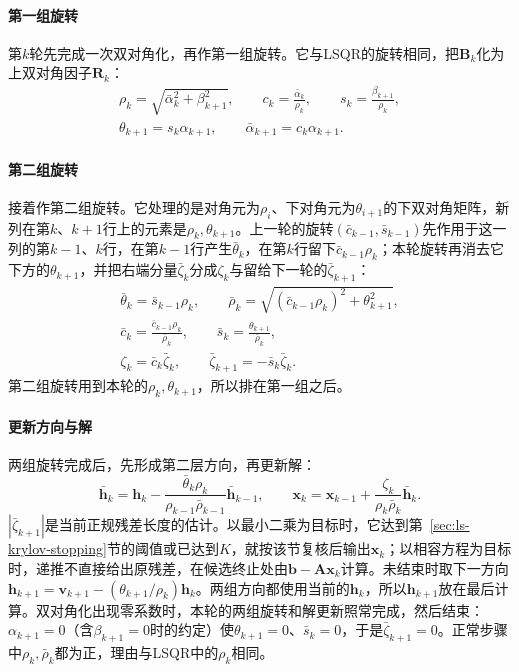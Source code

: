 \paragraph{第一组旋转}
第$k$轮先完成一次双对角化，再作第一组旋转。它与LSQR的旋转相同，把$\bm B_k$化为上双对角因子$\bm R_k$：
\[
 \begin{gathered}
 \rho_k=\sqrt{\bar\alpha_k^2+\beta_{k+1}^2},\qquad
 c_k=\frac{\bar\alpha_k}{\rho_k},\qquad s_k=\frac{\beta_{k+1}}{\rho_k},\\
 \theta_{k+1}=s_k\alpha_{k+1},\qquad
 \bar\alpha_{k+1}=c_k\alpha_{k+1}.
 \end{gathered}
\]

\paragraph{第二组旋转}
接着作第二组旋转。它处理的是对角元为$\rho_i$、下对角元为$\theta_{i+1}$的下双对角矩阵，新列在第$k$、$k+1$行上的元素是$\rho_k,\theta_{k+1}$。上一轮的旋转$(\bar c_{k-1},\bar s_{k-1})$先作用于这一列的第$k-1$、$k$行，在第$k-1$行产生$\bar\theta_k$，在第$k$行留下$\bar c_{k-1}\rho_k$；本轮旋转再消去它下方的$\theta_{k+1}$，并把右端分量$\bar\zeta_k$分成$\zeta_k$与留给下一轮的$\bar\zeta_{k+1}$：
\[
 \begin{gathered}
 \bar\theta_k=\bar s_{k-1}\rho_k,\qquad
 \bar\rho_k=\sqrt{(\bar c_{k-1}\rho_k)^2+\theta_{k+1}^2},\\
 \bar c_k=\frac{\bar c_{k-1}\rho_k}{\bar\rho_k},\qquad
 \bar s_k=\frac{\theta_{k+1}}{\bar\rho_k},\\
 \zeta_k=\bar c_k\bar\zeta_k,\qquad
 \bar\zeta_{k+1}=-\bar s_k\bar\zeta_k .
 \end{gathered}
\]
第二组旋转用到本轮的$\rho_k,\theta_{k+1}$，所以排在第一组之后。

\paragraph{更新方向与解}
两组旋转完成后，先形成第二层方向，再更新解：
\[
 \bar{\bm h}_k=\bm h_k-\frac{\bar\theta_k\rho_k}{\rho_{k-1}\bar\rho_{k-1}}\bar{\bm h}_{k-1},
 \qquad
 \bm x_k=\bm x_{k-1}+\frac{\zeta_k}{\rho_k\bar\rho_k}\bar{\bm h}_k .
\]
$|\bar\zeta_{k+1}|$是当前正规残差长度的估计。以最小二乘为目标时，它达到第~\ref{sec:ls-krylov-stopping}节的阈值或已达到$K$，就按该节复核后输出$\bm x_k$；以相容方程为目标时，递推不直接给出原残差，在候选终止处由$\bm b-\bm A\bm x_k$计算。未结束时取下一方向$\bm h_{k+1}=\bm v_{k+1}-(\theta_{k+1}/\rho_k)\bm h_k$。两组方向都使用当前的$\bm h_k$，所以$\bm h_{k+1}$放在最后计算。双对角化出现零系数时，本轮的两组旋转和解更新照常完成，然后结束：$\alpha_{k+1}=0$（含$\beta_{k+1}=0$时的约定）使$\theta_{k+1}=0$、$\bar s_k=0$，于是$\bar\zeta_{k+1}=0$。正常步骤中$\rho_k,\bar\rho_k$都为正，理由与LSQR中的$\rho_k$相同。

